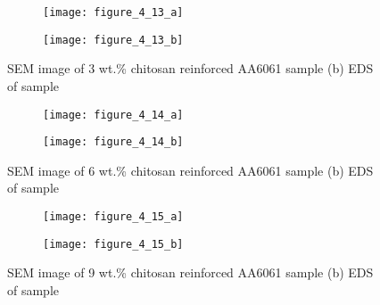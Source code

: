 \documentclass{article}
\begin{document}
\begin{multicols}{2}
                \begin{figure}[H]
                    \begin{subfigure}{.25\textwidth}
                        \texttt{[image: figure\_4\_13\_a]}
                        \label{fig:figure_4_13_a}
                    \end{subfigure}%
                    \begin{subfigure}{.25\textwidth}
                        \texttt{[image: figure\_4\_13\_b]}
                        \label{fig:figure_4_13_b}
                    \end{subfigure}
                    \caption{SEM image of 3 wt.\% chitosan reinforced AA6061 sample (b) EDS of sample}
                \end{figure}
                \begin{figure}[H]
                    \begin{subfigure}{.25\textwidth}
                        \texttt{[image: figure\_4\_14\_a]}
                        \label{fig:figure_4_14_a}
                    \end{subfigure}%
                    \begin{subfigure}{.25\textwidth}
                        \texttt{[image: figure\_4\_14\_b]}
                        \label{fig:figure_4_14_b}
                    \end{subfigure}
                    \caption{SEM image of 6 wt.\% chitosan reinforced AA6061 sample (b) EDS of sample}
                \end{figure}

                \begin{figure}[H]
                    \begin{subfigure}{.25\textwidth}
                        \texttt{[image: figure\_4\_15\_a]}
                        \label{fig:figure_4_15_a}
                    \end{subfigure}%
                    \begin{subfigure}{.25\textwidth}
                        \texttt{[image: figure\_4\_15\_b]}
                        \label{fig:figure_4_15_b}
                    \end{subfigure}
                    \caption{SEM image of 9 wt.\% chitosan reinforced AA6061 sample (b) EDS of sample}
                \end{figure}


\end{multicols}
\end{document}
